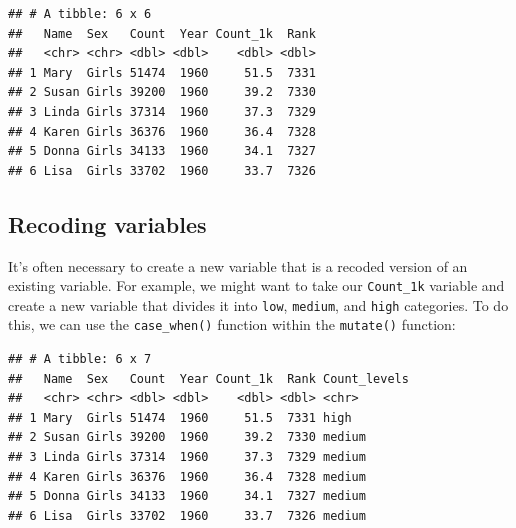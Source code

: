 \documentclass[]{book}
\newenvironment{Shaded}{\begin{snugshade}}{\end{snugshade}}
\newcommand{\CommentTok}[1]{\textcolor[rgb]{0.56,0.35,0.01}{\textit{#1}}}
\newcommand{\DataTypeTok}[1]{\textcolor[rgb]{0.13,0.29,0.53}{#1}}
\newcommand{\DecValTok}[1]{\textcolor[rgb]{0.00,0.00,0.81}{#1}}
\newcommand{\KeywordTok}[1]{\textcolor[rgb]{0.13,0.29,0.53}{\textbf{#1}}}
\newcommand{\NormalTok}[1]{#1}
\newcommand{\OperatorTok}[1]{\textcolor[rgb]{0.81,0.36,0.00}{\textbf{#1}}}
\newcommand{\StringTok}[1]{\textcolor[rgb]{0.31,0.60,0.02}{#1}}
\begin{document}
\begin{verbatim}
## # A tibble: 6 x 6
##   Name  Sex   Count  Year Count_1k  Rank
##   <chr> <chr> <dbl> <dbl>    <dbl> <dbl>
## 1 Mary  Girls 51474  1960     51.5  7331
## 2 Susan Girls 39200  1960     39.2  7330
## 3 Linda Girls 37314  1960     37.3  7329
## 4 Karen Girls 36376  1960     36.4  7328
## 5 Donna Girls 34133  1960     34.1  7327
## 6 Lisa  Girls 33702  1960     33.7  7326
\end{verbatim}

\hypertarget{recoding-variables}{%
\subsection{Recoding variables}\label{recoding-variables}}

It's often necessary to create a new variable that is a recoded version of an existing variable.
For example, we might want to take our \texttt{Count\_1k} variable and create a new variable that divides
it into \texttt{low}, \texttt{medium}, and \texttt{high} categories. To do this, we can use the \texttt{case\_when()}
function within the \texttt{mutate()} function:

\begin{Shaded}
\end{Shaded}

\begin{verbatim}
## # A tibble: 6 x 7
##   Name  Sex   Count  Year Count_1k  Rank Count_levels
##   <chr> <chr> <dbl> <dbl>    <dbl> <dbl> <chr>       
## 1 Mary  Girls 51474  1960     51.5  7331 high        
## 2 Susan Girls 39200  1960     39.2  7330 medium      
## 3 Linda Girls 37314  1960     37.3  7329 medium      
## 4 Karen Girls 36376  1960     36.4  7328 medium      
## 5 Donna Girls 34133  1960     34.1  7327 medium      
## 6 Lisa  Girls 33702  1960     33.7  7326 medium
\end{verbatim}
\end{document}
